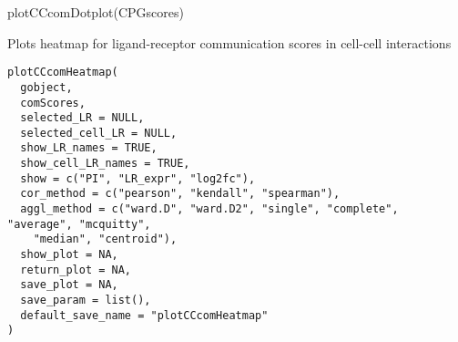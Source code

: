 \documentclass[a4paper]{book}
\begin{document}
%
\begin{Examples}
\begin{ExampleCode}
    plotCCcomDotplot(CPGscores)
\end{ExampleCode}
\end{Examples}
%
\begin{Description}\relax
Plots heatmap for ligand-receptor communication scores in cell-cell interactions
\end{Description}
%
\begin{Usage}
\begin{verbatim}
plotCCcomHeatmap(
  gobject,
  comScores,
  selected_LR = NULL,
  selected_cell_LR = NULL,
  show_LR_names = TRUE,
  show_cell_LR_names = TRUE,
  show = c("PI", "LR_expr", "log2fc"),
  cor_method = c("pearson", "kendall", "spearman"),
  aggl_method = c("ward.D", "ward.D2", "single", "complete", "average", "mcquitty",
    "median", "centroid"),
  show_plot = NA,
  return_plot = NA,
  save_plot = NA,
  save_param = list(),
  default_save_name = "plotCCcomHeatmap"
)
\end{verbatim}
\end{Usage}
%
\end{document}
